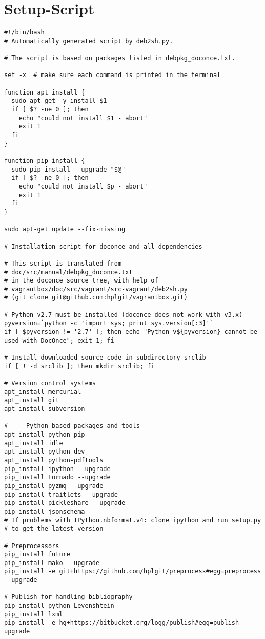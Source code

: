 \documentclass[%
oneside,                 %
final,                   %
chapterprefix=true,      %
open=right,              %
10pt]{book}
\begin{document}
\section{Setup-Script}
\begin{verbatim}
#!/bin/bash
# Automatically generated script by deb2sh.py.

# The script is based on packages listed in debpkg_doconce.txt.

set -x  # make sure each command is printed in the terminal

function apt_install {
  sudo apt-get -y install $1
  if [ $? -ne 0 ]; then
    echo "could not install $1 - abort"
    exit 1
  fi
}

function pip_install {
  sudo pip install --upgrade "$@"
  if [ $? -ne 0 ]; then
    echo "could not install $p - abort"
    exit 1
  fi
}

sudo apt-get update --fix-missing

# Installation script for doconce and all dependencies

# This script is translated from
# doc/src/manual/debpkg_doconce.txt
# in the doconce source tree, with help of
# vagrantbox/doc/src/vagrant/src-vagrant/deb2sh.py
# (git clone git@github.com:hplgit/vagrantbox.git)

# Python v2.7 must be installed (doconce does not work with v3.x)
pyversion=`python -c 'import sys; print sys.version[:3]'`
if [ $pyversion != '2.7' ]; then echo "Python v${pyversion} cannot be used with DocOnce"; exit 1; fi

# Install downloaded source code in subdirectory srclib
if [ ! -d srclib ]; then mkdir srclib; fi

# Version control systems
apt_install mercurial
apt_install git
apt_install subversion

# --- Python-based packages and tools ---
apt_install python-pip
apt_install idle
apt_install python-dev
apt_install python-pdftools
pip_install ipython --upgrade
pip_install tornado --upgrade
pip_install pyzmq --upgrade
pip_install traitlets --upgrade
pip_install pickleshare --upgrade
pip_install jsonschema
# If problems with IPython.nbformat.v4: clone ipython and run setup.py
# to get the latest version

# Preprocessors
pip_install future
pip_install mako --upgrade
pip_install -e git+https://github.com/hplgit/preprocess#egg=preprocess --upgrade

# Publish for handling bibliography
pip_install python-Levenshtein
pip_install lxml
pip_install -e hg+https://bitbucket.org/logg/publish#egg=publish --upgrade


\end{verbatim}
\end{document}

